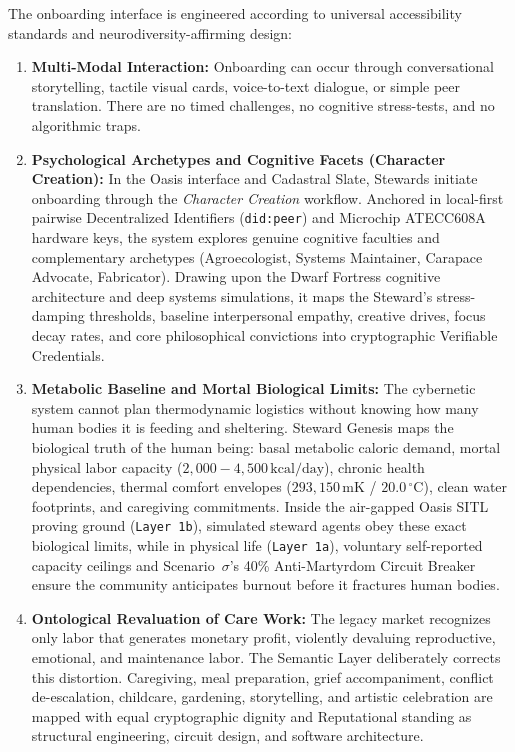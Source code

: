 The onboarding interface is engineered according to universal accessibility standards \parencite{w3c2023wcag} and neurodiversity-affirming design:
\begin{enumerate}
    \item \textbf{Multi-Modal Interaction:} Onboarding can occur through conversational storytelling, tactile visual cards, voice-to-text dialogue, or simple peer translation. There are no timed challenges, no cognitive stress-tests, and no algorithmic traps.
    \item \textbf{Psychological Archetypes and Cognitive Facets (Character Creation):} In the Oasis interface and Cadastral Slate, Stewards initiate onboarding through the \textit{Character Creation} workflow. Anchored in local-first pairwise Decentralized Identifiers (\texttt{did:peer}) and Microchip ATECC608A hardware keys, the system explores genuine cognitive faculties and complementary archetypes (Agroecologist, Systems Maintainer, Carapace Advocate, Fabricator). Drawing upon the Dwarf Fortress cognitive architecture and deep systems simulations, it maps the Steward's stress-damping thresholds, baseline interpersonal empathy, creative drives, focus decay rates, and core philosophical convictions into cryptographic Verifiable Credentials.
    \item \textbf{Metabolic Baseline and Mortal Biological Limits:} The cybernetic system cannot plan thermodynamic logistics without knowing how many human bodies it is feeding and sheltering. Steward Genesis maps the biological truth of the human being: basal metabolic caloric demand, mortal physical labor capacity ($2{,}000-4{,}500\,\mathrm{kcal/day}$), chronic health dependencies, thermal comfort envelopes ($293{,}150\,\mathrm{mK}$ / $20.0\,^\circ\mathrm{C}$), clean water footprints, and caregiving commitments. Inside the air-gapped Oasis SITL proving ground (\texttt{Layer 1b}), simulated steward agents obey these exact biological limits, while in physical life (\texttt{Layer 1a}), voluntary self-reported capacity ceilings and Scenario~$\sigma$'s 40\% Anti-Martyrdom Circuit Breaker ensure the community anticipates burnout before it fractures human bodies.
    \item \textbf{Ontological Revaluation of Care Work:} The legacy market recognizes only labor that generates monetary profit, violently devaluing reproductive, emotional, and maintenance labor. The Semantic Layer deliberately corrects this distortion. Caregiving, meal preparation, grief accompaniment, conflict de-escalation, childcare, gardening, storytelling, and artistic celebration are mapped with equal cryptographic dignity and Reputational standing as structural engineering, circuit design, and software architecture.

\end{enumerate}
